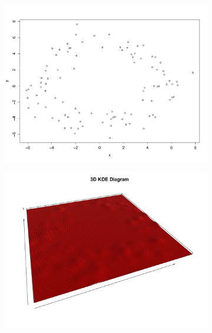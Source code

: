 \documentclass[a4paper]{article}
\begin{document}
\begin{figure}[htp!]
\centering
\begin{subfigure}{.32\textwidth}
  \centering
  \includegraphics[width=\linewidth]{noisecircle1}
\end{subfigure}%
\begin{subfigure}{.32\textwidth}
  \centering
  \includegraphics[width=\linewidth]{noisycircle2}
\end{subfigure}%
\begin{subfigure}{.32\textwidth}
  \centering

\end{subfigure}
\end{figure}
\end{document}
